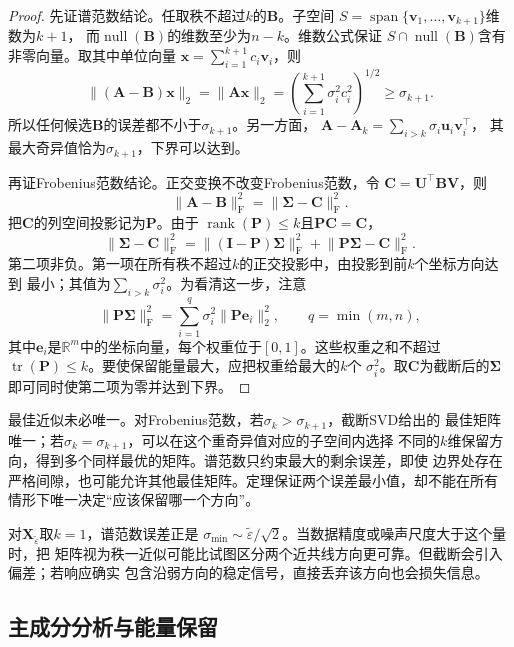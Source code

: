 \begin{proof}
先证谱范数结论。任取秩不超过$k$的$\bm{B}$。子空间
$S=\operatorname{span}\{\bm{v}_1,\ldots,\bm{v}_{k+1}\}$维数为$k+1$，
而$\operatorname{null}(\bm{B})$的维数至少为$n-k$。维数公式保证
$S\cap\operatorname{null}(\bm{B})$含有非零向量。取其中单位向量
$\bm{x}=\sum_{i=1}^{k+1}c_i\bm{v}_i$，则
\[
  \lVert(\bm{A}-\bm{B})\bm{x}\rVert_2
  =\lVert\bm{A}\bm{x}\rVert_2
  =
  \left(\sum_{i=1}^{k+1}\sigma_i^2c_i^2\right)^{1/2}
  \geq\sigma_{k+1}.
\]
所以任何候选$\bm{B}$的误差都不小于$\sigma_{k+1}$。另一方面，
$\bm{A}-\bm{A}_k=\sum_{i>k}\sigma_i\bm{u}_i\bm{v}_i^{\top}$，
其最大奇异值恰为$\sigma_{k+1}$，下界可以达到。

再证Frobenius范数结论。正交变换不改变Frobenius范数，令
$\bm{C}=\bm{U}^{\top}\bm{B}\bm{V}$，则
\[
  \lVert\bm{A}-\bm{B}\rVert_{\mathrm{F}}^2
  =\lVert\bm{\Sigma}-\bm{C}\rVert_{\mathrm{F}}^2.
\]
把$\bm{C}$的列空间投影记为$\bm{P}$。由于
$\operatorname{rank}(\bm{P})\leq k$且$\bm{P}\bm{C}=\bm{C}$，
\[
  \lVert\bm{\Sigma}-\bm{C}\rVert_{\mathrm{F}}^2
  =\lVert(\bm{I}-\bm{P})\bm{\Sigma}\rVert_{\mathrm{F}}^2+
  \lVert\bm{P}\bm{\Sigma}-\bm{C}\rVert_{\mathrm{F}}^2.
\]
第二项非负。第一项在所有秩不超过$k$的正交投影中，由投影到前$k$个坐标方向达到
最小；其值为$\sum_{i>k}\sigma_i^2$。为看清这一步，注意
\[
  \lVert\bm{P}\bm{\Sigma}\rVert_{\mathrm{F}}^2
  =\sum_{i=1}^{q}\sigma_i^2\lVert\bm{P}\bm{e}_i\rVert_2^2,
  \qquad q=\min(m,n),
\]
其中$\bm{e}_i$是$\mathbb{R}^m$中的坐标向量，每个权重位于$[0,1]$。这些权重之和不超过
$\operatorname{tr}(\bm{P})\leq k$。要使保留能量最大，应把权重给最大的$k$个
$\sigma_i^2$。取$\bm{C}$为截断后的$\bm{\Sigma}$即可同时使第二项为零并达到下界。
\end{proof}

最佳近似未必唯一。对Frobenius范数，若$\sigma_k>\sigma_{k+1}$，截断SVD给出的
最佳矩阵唯一；若$\sigma_k=\sigma_{k+1}$，可以在这个重奇异值对应的子空间内选择
不同的$k$维保留方向，得到多个同样最优的矩阵。谱范数只约束最大的剩余误差，即使
边界处存在严格间隙，也可能允许其他最佳矩阵。定理保证两个误差最小值，却不能在所有
情形下唯一决定“应该保留哪一个方向”。

对$\bm{X}_{\widetilde{\varepsilon}}$取$k=1$，谱范数误差正是
$\sigma_{\min}\sim\widetilde{\varepsilon}/\sqrt{2}$。当数据精度或噪声尺度大于这个量时，把
矩阵视为秩一近似可能比试图区分两个近共线方向更可靠。但截断会引入偏差；若响应确实
包含沿弱方向的稳定信号，直接丢弃该方向也会损失信息。

\subsection{主成分分析与能量保留}


